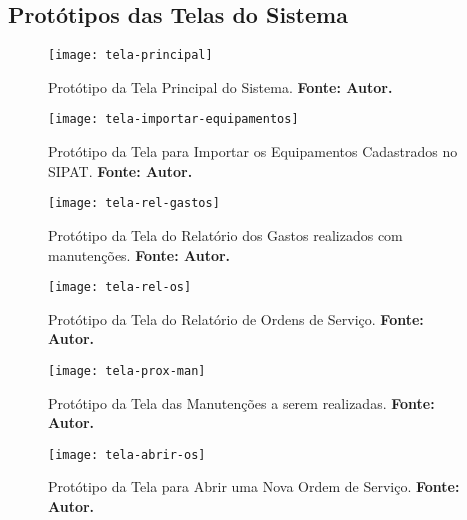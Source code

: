 \begin{apendicesenv}
\chapter{Protótipos das Telas do Sistema}

\graphicspath{{figuras/prototipos/}}
\begin{figure}[H]
\centering
\texttt{[image: tela-principal]}
\caption{Protótipo da Tela Principal do Sistema. \textbf{Fonte: Autor.}}
\label{tela-principal}
\end{figure}


\graphicspath{{figuras/prototipos/}}
\begin{figure}[H]
\centering
\texttt{[image: tela-importar-equipamentos]}
\caption{Protótipo da Tela para Importar os Equipamentos Cadastrados no SIPAT. \textbf{Fonte: Autor.}}
\label{tela-importar-equipamentos}
\end{figure}

\pagebreak

\graphicspath{{figuras/prototipos/}}
\begin{figure}[H]
\centering
\texttt{[image: tela-rel-gastos]}
\caption{Protótipo da Tela do Relatório dos Gastos realizados com manutenções. \textbf{Fonte: Autor.}}
\label{tela-rel-gastos}
\end{figure}

\pagebreak

\graphicspath{{figuras/prototipos/}}
\begin{figure}[H]
\centering
\texttt{[image: tela-rel-os]}
\caption{Protótipo da Tela do Relatório de Ordens de Serviço. \textbf{Fonte: Autor.}}
\label{tela-rel-os}
\end{figure}


\graphicspath{{figuras/prototipos/}}
\begin{figure}[H]
\centering
\texttt{[image: tela-prox-man]}
\caption{Protótipo da Tela das Manutenções a serem realizadas. \textbf{Fonte: Autor.}}
\label{tela-prox-man}
\end{figure}



\graphicspath{{figuras/prototipos/}}
\begin{figure}[H]
\centering
\texttt{[image: tela-abrir-os]}
\caption{Protótipo da Tela para Abrir uma Nova Ordem de Serviço. \textbf{Fonte: Autor.}}
\label{tela-abrir-os}
\end{figure}


\end{apendicesenv}
